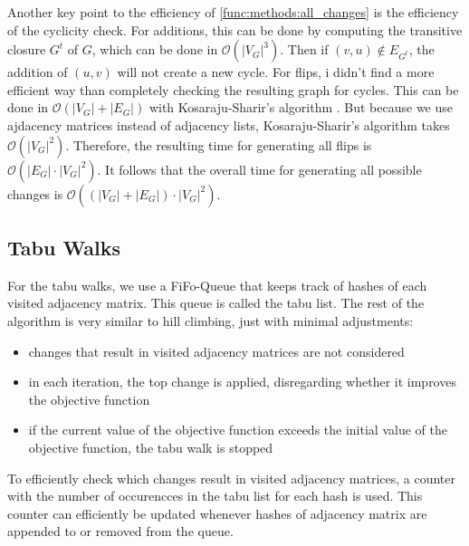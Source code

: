 \documentclass[sigconf, fleqn, prologue, dvipsnames]{acmart}
\newcommand{\abs}[1]{\left\vert #1 \right\vert}
\def\O{\mathcal{O}}
\begin{document}
Another key point to the efficiency of \autoref{func:methods:all_changes} is the efficiency of the cyclicity check.
For additions, this can be done by computing the transitive closure $G^t$ of $G$, which can be done in $\O(\abs{V_G}^3)$.
Then if $(v, u) \notin E_{G^t}$, the addition of $(u,v)$ will not create a new cycle.
For flips, i didn't find a more efficient way than completely checking the resulting graph for cycles.
This can be done in $\O(\abs{V_G} + \abs{E_G})$ with Kosaraju-Sharir's algorithm \cite{hopcroft1983data}.
But because we use ajdacency matrices instead of adjacency lists, Kosaraju-Sharir's algorithm takes $\O(\abs{V_G}^2)$.
Therefore, the resulting time for generating all flips is $\O(\abs{E_G} \cdot \abs{V_G}^2)$.
It follows that the overall time for generating all possible changes is $\O((\abs{V_G} + \abs{E_G}) \cdot \abs{V_G}^2)$.

\FloatBarrier


\subsection{Tabu Walks}
For the tabu walks, we use a FiFo-Queue that keeps track of hashes of each visited adjacency matrix. This queue is called the tabu list.
The rest of the algorithm is very similar to hill climbing, just with minimal adjustments:
\begin{itemize}
	\item changes that result in visited adjacency matrices are not considered
	\item in each iteration, the top change is applied, disregarding whether it improves the objective function
	\item if the current value of the objective function exceeds the initial value of the objective function, the tabu walk is stopped
\end{itemize}
To efficiently check which changes result in visited adjacency matrices, a counter with the number of occurencces in the tabu list for each hash is used.
This counter can efficiently be updated whenever hashes of adjacency matrix are appended to or removed from the queue.
\end{document}
